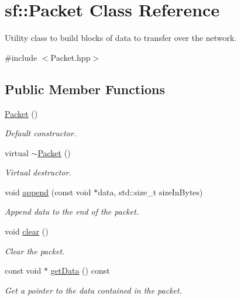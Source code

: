 \hypertarget{classsf_1_1_packet}{}\section{sf\+:\+:Packet Class Reference}
\label{classsf_1_1_packet}


Utility class to build blocks of data to transfer over the network.  




{\ttfamily \#include $<$Packet.\+hpp$>$}

\subsection*{Public Member Functions}
\begin{DoxyCompactItemize}
\item 
\mbox{\hyperlink{classsf_1_1_packet_a786e5d4ced83992ceefa1799963ea858}{Packet}} ()
\begin{DoxyCompactList}\small\item\em Default constructor. \end{DoxyCompactList}\item 
virtual \mbox{\hyperlink{classsf_1_1_packet_adc0490ca3c7c3d1e321bd742e5213913}{$\sim$\+Packet}} ()
\begin{DoxyCompactList}\small\item\em Virtual destructor. \end{DoxyCompactList}\item 
void \mbox{\hyperlink{classsf_1_1_packet_a7dd6e429b87520008326c4d71f1cf011}{append}} (const void $\ast$data, std\+::size\+\_\+t size\+In\+Bytes)
\begin{DoxyCompactList}\small\item\em Append data to the end of the packet. \end{DoxyCompactList}\item 
void \mbox{\hyperlink{classsf_1_1_packet_a133ea8b8fe6e93c230f0d79f19a3bf0d}{clear}} ()
\begin{DoxyCompactList}\small\item\em Clear the packet. \end{DoxyCompactList}\item 
const void $\ast$ \mbox{\hyperlink{classsf_1_1_packet_abfd771803c822f89f187e1fcc2af5afc}{get\+Data}} () const
\begin{DoxyCompactList}\small\item\em Get a pointer to the data contained in the packet. \end{DoxyCompactList}\item 

\end{DoxyCompactItemize}
